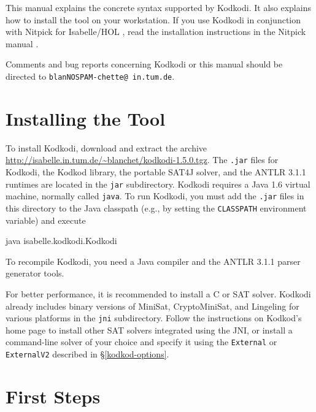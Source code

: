 \documentclass[a4paper,12pt]{article}
\begin{document}
    This manual explains the concrete syntax supported by Kodkodi. It also explains
    how to install the tool on your workstation. If you use Kodkodi in conjunction
    with Nitpick for Isabelle/HOL \cite{nitpick-2009}, read the installation
    instructions in the Nitpick manual \cite{blanchette-2009}.

    Comments and bug reports concerning Kodkodi or this manual should be directed to
    \texttt{blan{\color{white}NOSPAM}\kern-\wd\boxA{}chette@\allowbreak
    in.\allowbreak tum.\allowbreak de}.

%


    \section{Installing the Tool}
    \label{installing-the-tool}

    To install Kodkodi, download and extract the archive
    \url{http://isabelle.in.tum.de/~blanchet/kodkodi-1.5.0.tgz}. The \texttt{.jar}
    files for Kodkodi, the Kodkod library, the portable SAT4J solver, and the ANTLR
    3.1.1 runtimes are located in the \texttt{jar} subdirectory. Kodkodi
    requires a Java 1.6 virtual machine, normally called \texttt{java}. To run
    Kodkodi, you must add the \texttt{.jar} files in this directory to the Java
    classpath (e.g., by setting the \texttt{CLASSPATH} environment variable) and
    execute

    \pre
    \ttfamily\small java isabelle.kodkodi.Kodkodi
    \post

    To recompile Kodkodi, you need a Java compiler and the ANTLR 3.1.1 parser
    generator tools.

    For better performance, it is recommended to install a C or \cpp{} SAT solver.
    Kodkodi already includes binary versions of MiniSat, CryptoMiniSat, and
    Lingeling for various platforms in the \texttt{jni} subdirectory. Follow the
    instructions on Kodkod's home page \cite{kodkod-2009} to install other SAT
    solvers integrated using the JNI, or install a command-line solver of your
    choice and specify it using the \texttt{External} or \texttt{ExternalV2}
    described in \S\ref{kodkod-options}.


    \section{First Steps}
    \label{first-steps}
\end{document}
